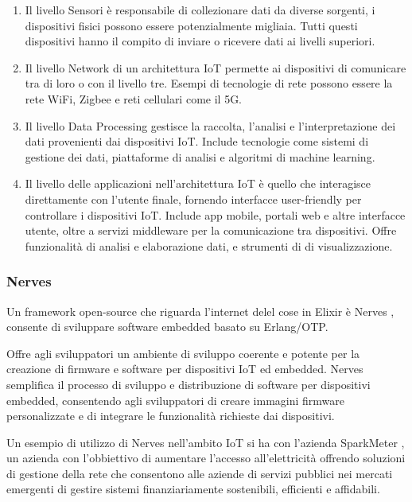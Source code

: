 \begin{enumerate}
	\item Il livello Sensori è responsabile di collezionare dati da
	diverse sorgenti, i dispositivi fisici possono essere potenzialmente
	migliaia. Tutti questi dispositivi hanno il compito di
	inviare o ricevere dati ai livelli superiori.
	\item Il livello Network di un architettura IoT permette ai
	dispositivi di comunicare tra di loro o con il livello tre.
	Esempi di tecnologie di rete possono essere la rete WiFi,
	Zigbee e reti cellulari come il 5G.
	\item Il livello Data Processing gestisce la
	raccolta, l'analisi e l'interpretazione dei dati
	provenienti dai dispositivi IoT.
	Include tecnologie come sistemi di gestione dei dati,
	piattaforme di analisi e algoritmi di machine learning.
	\item Il livello delle applicazioni nell'architettura
	IoT è quello che interagisce direttamente con 
	l'utente finale, fornendo interfacce user-friendly 
	per controllare i dispositivi IoT. 
	Include app mobile, portali web e altre interfacce utente,
	oltre a servizi middleware per la comunicazione tra dispositivi.
	Offre funzionalità di analisi e elaborazione dati, e strumenti
	di di visualizzazione.
\end{enumerate}

\subsubsection{Nerves}

Un framework open-source che riguarda l'internet delel cose
in Elixir è Nerves \cite{NervesPr90:online}, consente di
sviluppare software embedded basato su Erlang/OTP.

Offre agli sviluppatori un ambiente di sviluppo 
coerente e potente per la creazione di firmware
e software per dispositivi IoT ed embedded.
Nerves semplifica il processo di sviluppo e distribuzione
di software per dispositivi embedded,
consentendo agli sviluppatori di creare
immagini firmware personalizzate e di integrare le funzionalità
richieste dai dispositivi.

Un esempio di utilizzo di Nerves nell'ambito IoT si ha
con l'azienda SparkMeter \cite{SparkMet65:online},
un azienda con l'obbiettivo di aumentare l'accesso all'elettricità
offrendo soluzioni di gestione della rete che 
consentono alle aziende di servizi pubblici nei mercati emergenti
di gestire sistemi finanziariamente sostenibili,
efficienti e affidabili.

